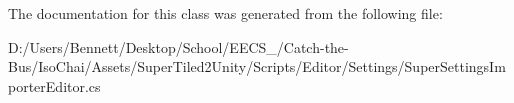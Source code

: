The documentation for this class was generated from the following file\+:\begin{DoxyCompactItemize}
\item 
D\+:/\+Users/\+Bennett/\+Desktop/\+School/\+E\+E\+C\+S\+\_/\+Catch-\/the-\/\+Bus/\+Iso\+Chai/\+Assets/\+Super\+Tiled2\+Unity/\+Scripts/\+Editor/\+Settings/Super\+Settings\+Importer\+Editor.\+cs\end{DoxyCompactItemize}
